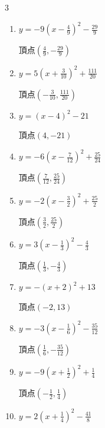 \begin{multicols}{3}
\begin{enumerate}
        $\displaystyle 頂点\left( -\frac{5}{18} , \frac{277}{36} \right)$

  \item $\displaystyle y=-9\left( x-\frac{4}{9}\right)^{2}-\frac{29}{9}$

        $\displaystyle 頂点\left( \frac{4}{9} , -\frac{29}{9} \right)$

  \item $\displaystyle y=5\left( x+\frac{3}{10}\right)^{2}+\frac{111}{20}$

        $\displaystyle 頂点\left( -\frac{3}{10} , \frac{111}{20} \right)$

  \item $\displaystyle y=\left( x-4\right)^{2}-21$

        $\displaystyle 頂点\left( 4 , -21 \right)$

\columnbreak %

  \item $\displaystyle y=-6\left( x-\frac{7}{12}\right)^{2}+\frac{25}{24}$

        $\displaystyle 頂点\left( \frac{7}{12} , \frac{25}{24} \right)$

  \item $\displaystyle y=-2\left( x-\frac{3}{2}\right)^{2}+\frac{25}{2}$

        $\displaystyle 頂点\left( \frac{3}{2} , \frac{25}{2} \right)$

  \item $\displaystyle y=3\left( x-\frac{1}{3}\right)^{2}-\frac{4}{3}$

        $\displaystyle 頂点\left( \frac{1}{3} , -\frac{4}{3} \right)$

  \item $\displaystyle y=-\left( x+2\right)^{2}+13$

        $\displaystyle 頂点\left( -2 , 13 \right)$

  \item $\displaystyle y=-3\left( x-\frac{1}{6}\right)^{2}-\frac{35}{12}$

        $\displaystyle 頂点\left( \frac{1}{6} , -\frac{35}{12} \right)$

  \item $\displaystyle y=-9\left( x+\frac{1}{2}\right)^{2}+\frac{1}{4}$

        $\displaystyle 頂点\left( -\frac{1}{2} , \frac{1}{4} \right)$

  \item $\displaystyle y=2\left( x+\frac{1}{4}\right)^{2}-\frac{41}{8}$


\end{enumerate}
\end{multicols}
